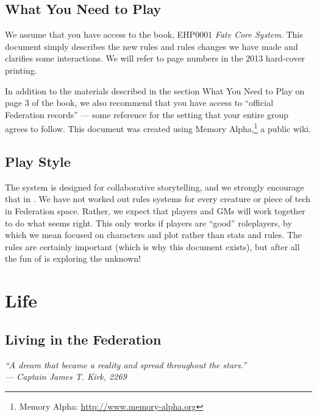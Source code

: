 \documentclass[12pt,titlepage,openany]{book}
\begin{document}
\section{What You Need to Play}

We assume that you have access to the \FateCore{} book, EHP0001 \textit{Fate
Core System}. This document simply describes the new rules and rules changes we
have made and clarifies some interactions. We will refer to page numbers in the
2013 hard-cover printing.

In addition to the materials described in the section What You Need to Play on
page 3 of the \FateCore{} book, we also recommend that you have access to
``official Federation records'' --- some reference for the \StarTrek{} setting
that your entire group agrees to follow. This document was created using Memory
Alpha,\footnote{Memory Alpha: \url{http://www.memory-alpha.org}} a public
\StarTrek{} wiki.

\section{Play Style}

The \FateCore{} system is designed for collaborative storytelling, and we
strongly encourage that in \StarTrekFate{}. We have not worked out rules
systems for every creature or piece of tech in Federation space. Rather, we
expect that players and GMs will work together to do what seems right. This
only works if players are ``good'' roleplayers, by which we mean focused on
characters and plot rather than stats and rules. The rules are certainly
important (which is why this document exists), but after all the fun of
\StarTrek{} is exploring the unknown!



\chapter{\StarTrek{} Life}\label{chap:life}

\section{Living in the Federation}

\begin{center}
\textit{``A dream that became a reality and spread throughout the stars.''\\
--- Captain James T. Kirk, 2269}
\end{center}
\end{document}
